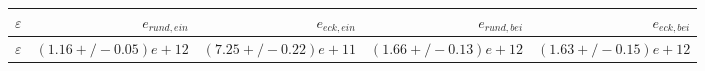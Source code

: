 \begin{tabular}{lrrrr}\toprule$\varepsilon$ & $e_{rund, ein}$ & $e_{eck, ein}$ & $e_{rund, bei}$ & $e_{eck, bei}$ \\\midrule$\varepsilon$ & $(1.16+/-0.05)e+12$ & $(7.25+/-0.22)e+11$ & $(1.66+/-0.13)e+12$ & $(1.63+/-0.15)e+12$ \\\bottomrule\end{tabular}